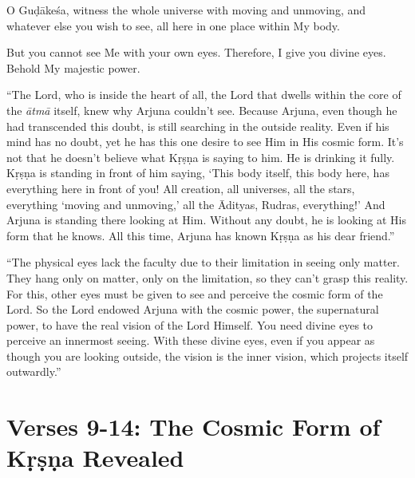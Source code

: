 {O Guḍākeśa, witness the whole universe with moving and unmoving, and whatever else you wish to see, all here in one place within My body.}

{But you cannot see Me with your own eyes. Therefore, I give you divine eyes. Behold My majestic power.}

\enquote{The Lord, who is inside the heart of all, the Lord that dwells within the core of the \textit{ātmā} itself, knew why Arjuna couldn’t see. Because Arjuna, even though he had transcended this doubt, is still searching in the outside reality. Even if his mind has no doubt, yet he has this one desire to see Him in His cosmic form. It’s not that he doesn’t believe what Kṛṣṇa is saying to him. He is drinking it fully. Kṛṣṇa is standing in front of him saying, \enquote{This body itself, this body here, has everything here in front of you! All creation, all universes, all the stars, everything ‘moving and unmoving,’ all the Ādityas, Rudras, everything!} And Arjuna is standing there looking at Him. Without any doubt, he is looking at His form that he knows. All this time, Arjuna has known Kṛṣṇa as his dear friend.}

\enquote{The physical eyes lack the faculty due to their limitation in seeing only matter. They hang only on matter, only on the limitation, so they can’t grasp this reality. For this, other eyes must be given to see and perceive the cosmic form of the Lord. So the Lord endowed Arjuna with the cosmic power, the supernatural power, to have the real vision of the Lord Himself. You need divine eyes to perceive an innermost seeing. With these divine eyes, even if you appear as though you are looking outside, the vision is the inner vision, which projects itself outwardly.}

\newpage
\section{Verses 9-14: The Cosmic Form of Kṛṣṇa Revealed}\label{sec-verses-9-14-the-cosmic-form-of-krsna-revealed}

